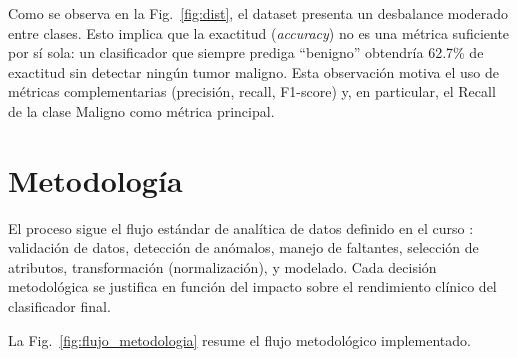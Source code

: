 \documentclass[journal]{IEEEtran}
\begin{document}
Como se observa en la Fig.~\ref{fig:dist}, el dataset presenta un desbalance moderado entre clases. Esto implica que la exactitud (\textit{accuracy}) no es una métrica suficiente por sí sola: un clasificador que siempre prediga ``benigno'' obtendría 62.7\% de exactitud sin detectar ningún tumor maligno. Esta observación motiva el uso de métricas complementarias (precisión, recall, F1-score) y, en particular, el Recall de la clase Maligno como métrica principal.

\section{Metodología}

El proceso sigue el flujo estándar de analítica de datos definido en el curso \cite{curso_ud}: validación de datos, detección de anómalos, manejo de faltantes, selección de atributos, transformación (normalización), y modelado. Cada decisión metodológica se justifica en función del impacto sobre el rendimiento clínico del clasificador final.

La Fig.~\ref{fig:flujo_metodologia} resume el flujo metodológico implementado.
\end{document}
